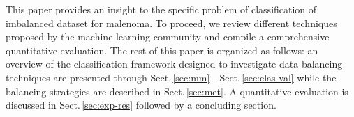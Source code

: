 This paper provides an insight to the specific problem of classification of imbalanced dataset for malenoma. 
To proceed, we review different techniques proposed by the machine learning community and compile a comprehensive quantitative evaluation. 
The rest of this paper is organized as follows: an overview of the classification framework designed to investigate data balancing techniques are presented through Sect.\,\ref{sec:mm} - Sect.\,\ref{sec:clas-val} while the balancing strategies are described in Sect.\,\ref{sec:met}.
A quantitative evaluation is discussed in Sect.\,\ref{sec:exp-res} followed by a concluding section.





